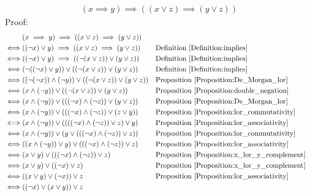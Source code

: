 \begin{prop}
\label{Proposition:implies_lor}
\begin{align*}
(x \implies y) \implies ((x \lor z) \implies (y \lor z))
\end{align*}
Proof:
\begin{align*}
& (x \implies y) \implies ((x \lor z) \implies (y \lor z)) \\
\iff & ((\lnot x) \lor y) \implies ((x \lor z) \implies (y \lor z))
&& \text{Definition \ref{Definition:implies}} \\
\iff & ((\lnot x) \lor y) \implies ((\lnot (x \lor z)) \lor (y \lor z))
&& \text{Definition \ref{Definition:implies}} \\
\iff & (\lnot ((\lnot x) \lor y)) \lor ((\lnot (x \lor z)) \lor (y \lor z))
&& \text{Definition \ref{Definition:implies}} \\
\iff & ((\lnot(\lnot x)) \land (\lnot y)) \lor ((\lnot (x \lor z)) \lor (y \lor z))
&& \text{Proposition \ref{Proposition:De_Morgan_lor}} \\
\iff & (x \land (\lnot y)) \lor ((\lnot (x \lor z)) \lor (y \lor z))
&& \text{Proposition \ref{Proposition:double_negation}} \\
\iff & (x \land (\lnot y)) \lor (((\lnot x) \land (\lnot z)) \lor (y \lor z))
&& \text{Proposition \ref{Proposition:De_Morgan_lor}} \\
\iff & (x \land (\lnot y)) \lor (((\lnot x) \land (\lnot z)) \lor (z \lor y))
&& \text{Proposition \ref{Proposition:lor_commutativity}} \\
\iff & (x \land (\lnot y)) \lor ((((\lnot x) \land (\lnot z)) \lor z) \lor y)
&& \text{Proposition \ref{Proposition:lor_associativity}} \\
\iff & (x \land (\lnot y)) \lor (y \lor (((\lnot x) \land (\lnot z)) \lor z))
&& \text{Proposition \ref{Proposition:lor_commutativity}} \\
\iff & ((x \land (\lnot y)) \lor y) \lor (((\lnot x) \land (\lnot z)) \lor z)
&& \text{Proposition \ref{Proposition:lor_associativity}} \\
\iff & (x \lor y) \lor (((\lnot x) \land (\lnot z)) \lor z)
&& \text{Proposition \ref{Proposition:x_lor_y_complement}} \\
\iff & (x \lor y) \lor ((\lnot x) \lor z)
&& \text{Proposition \ref{Proposition:x_lor_y_complement}} \\
\iff & ((x \lor y) \lor (\lnot x)) \lor z
&& \text{Proposition \ref{Proposition:lor_associativity}} \\
\iff & ((\lnot x) \lor (x \lor y)) \lor z

\end{align*}
\end{prop}
